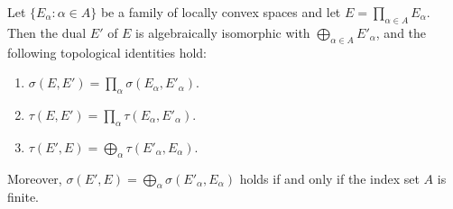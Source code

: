 Let $\{E_\alpha : \alpha \in A\}$ be a family of locally convex spaces and let $E = \prod_{\alpha \in A} E_\alpha$. Then the dual $E'$ of $E$ is algebraically isomorphic with $\bigoplus_{\alpha \in A} E'_\alpha$, and the following topological identities hold:
\begin{enumerate}
\item $\sigma(E, E') = \prod_{\alpha} \sigma(E_\alpha, E'_\alpha)$.
\item $\tau(E, E') = \prod_{\alpha} \tau(E_\alpha, E'_\alpha)$.
\item $\tau(E', E) = \bigoplus_{\alpha} \tau(E'_\alpha, E_\alpha)$.
\end{enumerate}
Moreover, $\sigma(E', E) = \bigoplus_{\alpha} \sigma(E'_\alpha, E_\alpha)$ holds if and only if the index set $A$ is finite.

